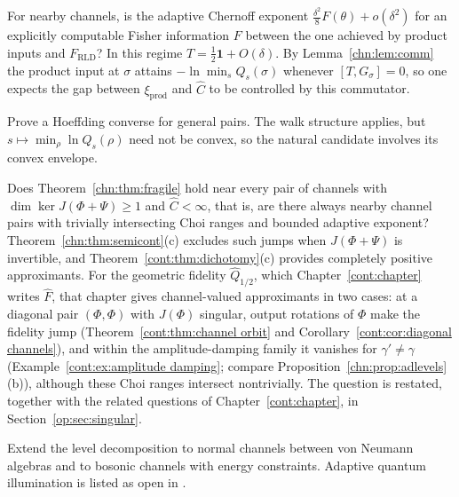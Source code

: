 \begin{question}\label{chn:q:local}
For nearby channels, is the adaptive Chernoff exponent $\frac{\delta^2}{8}F(\theta)+o(\delta^2)$ for an explicitly computable Fisher information $F$ between the one achieved by product inputs and $F_{\mathrm{RLD}}$? In this regime $T=\tfrac12\mathbf 1+O(\delta)$. By Lemma~\ref{chn:lem:comm} the product input at $\sigma$ attains $-\ln\min_sQ_s(\sigma)$ whenever $[T,G_\sigma]=0$, so one expects the gap between $\xi_{\mathrm{prod}}$ and $\widehat C$ to be controlled by this commutator.
\end{question}

\begin{question}\label{chn:q:hoeffding}
Prove a Hoeffding converse for general pairs. The walk structure applies, but $s\mapsto\min_\rho\ln Q_s(\rho)$ need not be convex, so the natural candidate involves its convex envelope.
\end{question}

\begin{question}\label{chn:q:dense}
Does Theorem~\ref{chn:thm:fragile} hold near every pair of channels with $\dim\ker J(\Phi+\Psi)\ge1$ and $\widehat C<\infty$, that is, are there always nearby channel pairs with trivially intersecting Choi ranges and bounded adaptive exponent? Theorem~\ref{chn:thm:semicont}(c) excludes such jumps when $J(\Phi+\Psi)$ is invertible, and Theorem~\ref{cont:thm:dichotomy}(c) provides completely positive approximants.
For the geometric fidelity $\widehat Q_{1/2}$, which Chapter~\ref{cont:chapter} writes $\widehat F$, that chapter gives channel-valued approximants in two cases: at a diagonal pair $(\Phi,\Phi)$ with $J(\Phi)$ singular, output rotations of $\Phi$ make the fidelity jump (Theorem~\ref{cont:thm:channel orbit} and Corollary~\ref{cont:cor:diagonal channels}), and within the amplitude-damping family it vanishes for $\gamma'\ne\gamma$ (Example~\ref{cont:ex:amplitude damping}; compare Proposition~\ref{chn:prop:adlevels}(b)), although these Choi ranges intersect nontrivially. The question is restated, together with the related questions of Chapter~\ref{cont:chapter}, in Section~\ref{op:sec:singular}.
\end{question}

\begin{question}\label{chn:q:vn}
Extend the level decomposition to normal channels between von Neumann algebras and to bosonic channels with energy constraints. Adaptive quantum illumination is listed as open in \cite{NairGu2020}.
\end{question}

\endgroup
